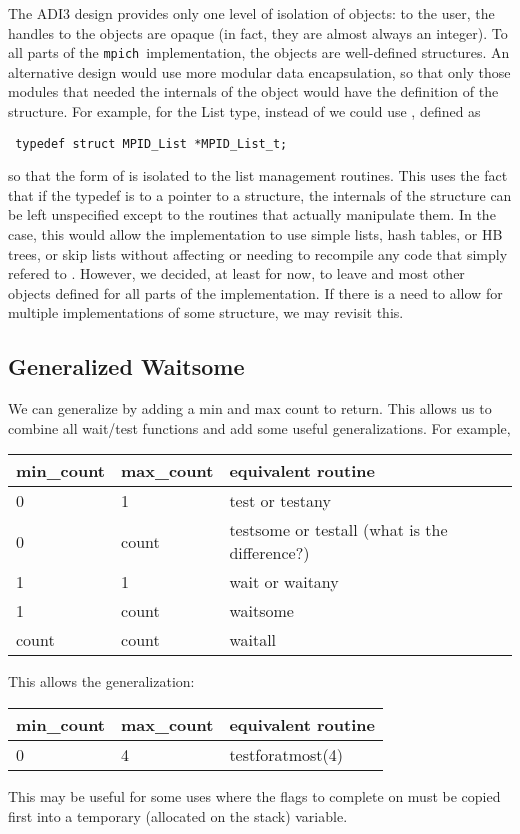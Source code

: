 \documentclass{article}
\newcommand{\mpich}{\texttt{mpich}}
\begin{document}
The ADI3 design provides only one level of isolation of objects: to
the user, the handles to the objects are opaque (in fact, they are
almost always an integer).  To all parts of the \mpich\ implementation,
the objects are well-defined structures.  An alternative design would
use more modular data encapsulation, so that only those modules that
needed the internals of the object would have the definition of the
structure.  For example, for the List type, instead of  we could use , defined as
\begin{verbatim}
 typedef struct MPID_List *MPID_List_t;
\end{verbatim}
so that the form of  is isolated to the list
management routines.
This uses the fact that if the typedef is to a pointer to a structure,
the internals of the 
structure can be left unspecified except to the routines that actually 
manipulate them.  In the  case, this would allow the
implementation 
to use simple lists, hash tables, or HB trees, or skip lists without 
affecting or needing to recompile any code that simply refered to
. 
However, we decided, at least for now, to leave  and
most other objects defined for all parts of the implementation.  If
there is a need to allow for multiple implementations of some
structure, we may revisit this.  

\subsection{Generalized Waitsome}
We can generalize  by adding a min and max
count to return.  This allows us to combine all 
wait/test functions and add some useful generalizations.  For
example,

\begin{center}
\begin{tabular}{lll}
      min_count  & max_count&    equivalent routine\\\hline
      0          & 1        &    test or testany\\
      0          & count    &    testsome or testall (what is the difference?)\\
      1          & 1        &    wait or waitany\\
      1          & count    &    waitsome\\
      count      & count    &    waitall
\end{tabular}
\end{center}
  This allows the generalization:
\begin{center}
\begin{tabular}{lll}
      min_count  & max_count&    equivalent routine\\\hline
      0          & 4        &    testforatmost(4)
\end{tabular}
\end{center}
This may be useful for some uses where the flags to complete on must be 
copied first into a temporary (allocated on the stack) variable.
\end{document}
